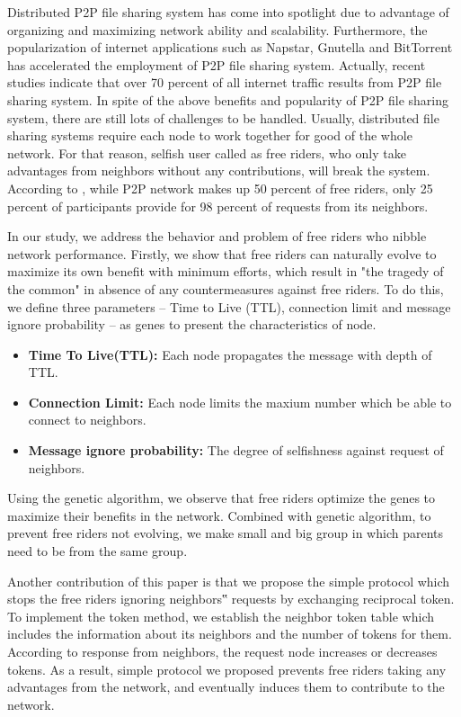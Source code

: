 \documentclass[12pt,journal,draftcls,letterpaper,onecolumn]{IEEEtran}
\begin{document}
Distributed P2P file sharing system has come into spotlight due to advantage of organizing
and maximizing network ability and scalability. Furthermore, the popularization of internet
applications such as Napstar\cite{napster}, Gnutella\cite{gnutella} and BitTorrent\cite{bittorrent} has accelerated the
employment of P2P file sharing system. Actually, recent studies indicate that over
70 percent of all internet traffic results from P2P file sharing system. In spite of the above benefits
and popularity of P2P file sharing system, there are still lots of challenges to be handled.
Usually, distributed file sharing systems require each node to work together for good of the
whole network. For that reason, selfish user called as free riders, who only take advantages
from neighbors without any contributions, will break the system. According to \cite{hd:belltoll}, while P2P
network makes up 50 percent of free riders, only 25 percent of participants provide for 98
percent of requests from its neighbors.

In our study, we address the behavior and problem of free riders who nibble network
performance. Firstly, we show that free riders can naturally evolve to maximize its own
benefit with minimum efforts, which result in "the tragedy of the common\cite{tc:tragedy}" in absence of
any countermeasures against free riders. To do this, we define three parameters – Time to
Live (TTL), connection limit and message ignore probability – as genes to present the
characteristics of node.\\

\begin{itemize}
\item {\bf Time To Live(TTL):}
Each node propagates the message with depth of TTL.\\
\item {\bf Connection Limit:}
Each node limits the maxium number which be able to connect to neighbors.\\
\item {\bf Message ignore probability:}
The degree of selfishness against request of neighbors.\\
\end{itemize}

Using the genetic algorithm, we observe that free riders optimize the genes to maximize 
their benefits in the network. Combined with genetic algorithm, to prevent free riders not 
evolving, we make small and big group in which parents need to be from the same group.

Another contribution of this paper is that we propose the simple protocol which stops the free
riders ignoring neighbors‟ requests by exchanging reciprocal token. To implement the token
method, we establish the neighbor token table which includes the information about its
neighbors and the number of tokens for them. According to response from neighbors, the
request node increases or decreases tokens. As a result, simple protocol we proposed prevents
free riders taking any advantages from the network, and eventually induces them to
contribute to the network.
\end{document}
